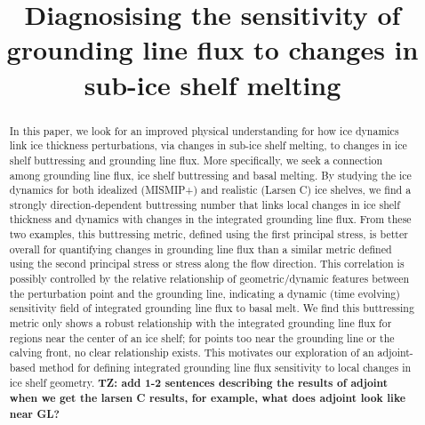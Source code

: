 \documentclass[tc, manuscript]{copernicus}
\begin{document}
\title{Diagnosising the sensitivity of grounding line flux to changes in sub-ice shelf melting}




\received{}
\pubdiscuss{} %
\revised{}
\accepted{}
\published{}

\maketitle
 
\begin{abstract}
In this paper, we look for an improved physical understanding for how ice dynamics link ice thickness perturbations, via changes in sub-ice shelf melting, to changes in ice shelf buttressing and grounding line flux. More specifically, we seek a connection among grounding line flux, ice shelf buttressing and basal melting. By studying the ice dynamics for both idealized (MISMIP+) and realistic (Larsen C) ice shelves, we find a strongly direction-dependent buttressing number that links local changes in ice shelf thickness and dynamics with changes in the integrated grounding line flux. From these two examples, this buttressing metric, defined using the first principal stress, is better overall for quantifying changes in grounding line flux than a similar metric defined using the second principal stress or stress along the flow direction. This correlation is possibly controlled by the relative relationship of geometric/dynamic features between the perturbation point and the grounding line, indicating a dynamic (time evolving) sensitivity field of integrated grounding line flux to basal melt. We find this buttressing metric only shows a robust relationship with the integrated grounding line flux for regions near the center of an ice shelf; for points too near the grounding line or the calving front, no clear relationship exists. This motivates our exploration of an adjoint-based method for defining integrated grounding line flux sensitivity to local changes in ice shelf geometry. \textbf{TZ: add 1-2 sentences describing the results of adjoint when we get the larsen C results, for example, what does adjoint look like near GL?}
\end{abstract}
\end{document}
